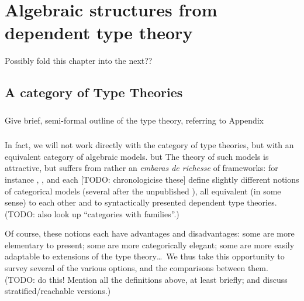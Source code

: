 
\chapter{Algebraic structures from dependent type theory}



Possibly fold this chapter into the next??

\section{A category of Type Theories}

\subsection{}Give brief, semi-formal outline of the type theory, referring to Appendix

\subsection{}In fact, we will not work directly with the category of type theories, but with an equivalent category of algebraic models.
but 
The theory of such models is attractive, but suffers from rather an \emph{embaras de richesse} of frameworks: for instance \cite{jacobs:comprehension-categories}, \cite{pitts:categorical-logic}, \cite{hofmann:syntax-and-semantics} and \cite{dybjer:internal-type-theory} each [TODO: chronologicise these] define slightly different notions of categorical models (several after the unpublished \cite{cartmell:thesis}), all equivalent (in some sense) to each other and to syntactically presented dependent type theories.   (TODO: also look up ``categories with families''.)

Of course, these notions each have advantages and disadvantages: some are more elementary to present; some are more categorically elegant; some are more easily adaptable to extensions of the type theory\ldots\  We thus take this opportunity to survey several of the various options, and the comparisons between them.  (TODO: do this!  Mention all the definitions above, at least briefly; and discuss stratified/reachable versions.)

